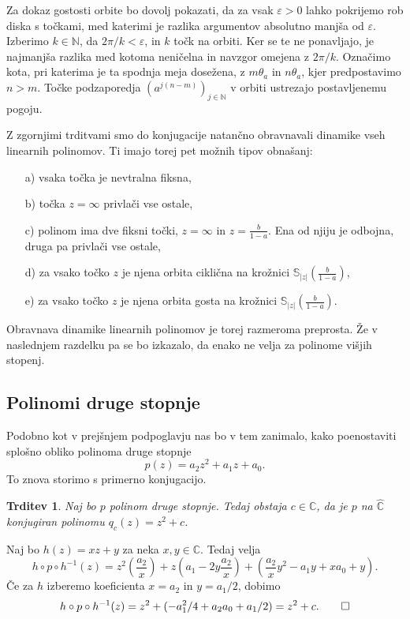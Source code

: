 \documentclass[12pt,a4paper]{amsart}
\theoremstyle{definition} %
\theoremstyle{plain} %
\newtheorem{trditev}[definicija]{Trditev}
\newcommand{\N}{\mathbb N}
\newcommand{\CC}{\mathbb C}
\newcommand{\CCinf} {\hat{\CC}} %
\newcommand{\SSS}{\mathbb S} %
\begin{document}
Za dokaz gostosti orbite bo dovolj pokazati, da za vsak $\varepsilon > 0$ lahko pokrijemo rob
diska s točkami, med katerimi je razlika argumentov absolutno manjša od $\varepsilon$.
Izberimo $k \in\N$, da $2\pi / k < \varepsilon$, in $k$ točk na orbiti.
Ker se te ne ponavljajo, je najmanjša razlika med kotoma neničelna in navzgor omejena z $2\pi / k$.
Označimo kota, pri katerima je ta spodnja meja dosežena, z $m\theta_a$ in $n\theta_a$, kjer predpostavimo $n > m$.
Točke podzaporedja $(a^{j(n - m)})_{j \in \N}$ v orbiti ustrezajo postavljenemu pogoju.
\endproof

\noindent Z zgornjimi trditvami smo do konjugacije natančno obravnavali dinamike vseh linearnih polinomov.
Ti imajo torej pet možnih tipov obnašanj:
\begin{enumerate}
\item[a)] vsaka točka je nevtralna fiksna,
\item[b)] točka $z=\infty$ privlači vse ostale,
\item[c)] polinom ima dve fiksni točki, $z=\infty$ in $z=\frac{b}{1-a}$. Ena od njiju je odbojna, druga pa privlači vse ostale,
\item[d)] za vsako točko $z$ je njena orbita ciklična na krožnici $\SSS_{|z|}(\frac{b}{1-a})$,
\item[e)] za vsako točko $z$ je njena orbita gosta na krožnici $\SSS_{|z|}(\frac{b}{1-a})$.
\end{enumerate}

\noindent Obravnava dinamike linearnih polinomov je torej razmeroma preprosta. 
Že v naslednjem razdelku pa se bo izkazalo, da enako ne velja za polinome višjih stopenj.

\subsection{Polinomi druge stopnje}
Podobno kot v prejšnjem podpoglavju nas bo v tem zanimalo, kako poenostaviti splošno 
obliko polinoma druge stopnje
$$p(z) = a_2z^2 + a_1z + a_0.$$
To znova storimo s primerno konjugacijo.

\begin{trditev}\label{trd:quadraticConjugation}
Naj bo $p$ polinom druge stopnje. 
Tedaj obstaja $c\in\CC$, 
da je $p$ na $\CCinf$ konjugiran polinomu $q_c(z)=z^2 + c$.
\end{trditev}

\proof
Naj bo $h(z) = xz + y$ za neka $x, y \in \CC$. Tedaj velja
$$h \circ p \circ h^{-1} (z) = z^2 \left(\frac{a_2}{x}\right) + z \left(a_1 - 2y\frac{a_2}{x}\right) + \left(\frac{a_2}{x}y^2 - a_1y + xa_0 + y\right).$$
Če za $h$ izberemo koeficienta $x = a_2$ in $y = a_1 / 2$, dobimo
\begin{equation*}
h\circ p \circ h^{-1} (z) =  z^2 + (-a_1^2 / 4 + a_2a_0 + a_1 / 2) = z^2 + c.\hfill\qedhere
\end{equation*}
\endproof
\end{document}
